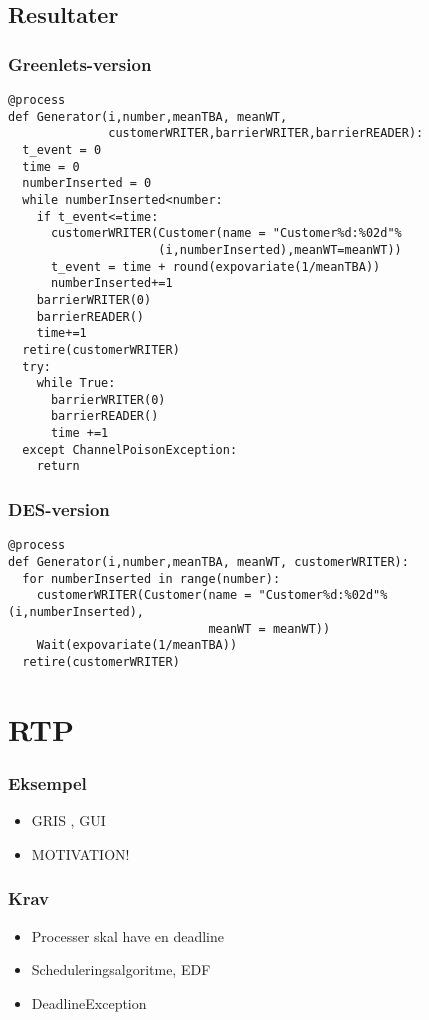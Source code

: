 \documentclass[12pt]{beamer}
\begin{document}

\subsection{Resultater}
\begin{frame}[fragile]
  \frametitle{Greenlets-version}
\begin{lstlisting}
@process
def Generator(i,number,meanTBA, meanWT,
              customerWRITER,barrierWRITER,barrierREADER):
  t_event = 0
  time = 0
  numberInserted = 0
  while numberInserted<number:
    if t_event<=time:
      customerWRITER(Customer(name = "Customer%d:%02d"%
                     (i,numberInserted),meanWT=meanWT))
      t_event = time + round(expovariate(1/meanTBA))
      numberInserted+=1
    barrierWRITER(0)
    barrierREADER()
    time+=1
  retire(customerWRITER)
  try:
    while True:
      barrierWRITER(0)
      barrierREADER()
      time +=1
  except ChannelPoisonException: 
    return
\end{lstlisting}
\end{frame}

\begin{frame}[fragile]
  \frametitle{DES-version}
\begin{lstlisting}
@process
def Generator(i,number,meanTBA, meanWT, customerWRITER):
  for numberInserted in range(number):
    customerWRITER(Customer(name = "Customer%d:%02d"%(i,numberInserted),
                            meanWT = meanWT))
    Wait(expovariate(1/meanTBA))
  retire(customerWRITER)
\end{lstlisting}
\end{frame}

\section{RTP}
\begin{frame}
  \frametitle{Eksempel}
  \begin{itemize}   
    \item GRIS , GUI	
    \item MOTIVATION!
  \end{itemize}
\end{frame}

\begin{frame}
  \frametitle{Krav}
  \begin{itemize}   
	\item Processer skal have en  deadline
	\item Scheduleringsalgoritme, EDF
	\item DeadlineException
  \end{itemize}
\end{frame}
\end{document}
